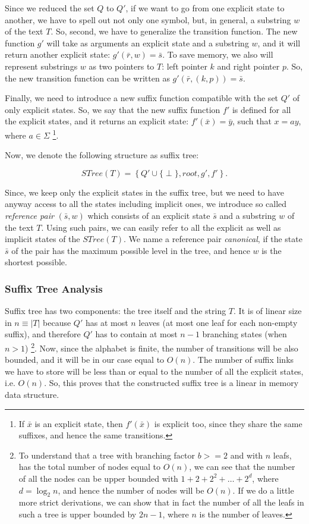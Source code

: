 \documentclass[paper=a4, fontsize=11pt]{scrartcl} %
\numberwithin{equation}{section} %
\numberwithin{figure}{section} %
\numberwithin{table}{section} %
\begin{document}
Since we reduced the set $Q$ to $Q'$, if we want to go from one explicit state to another, we have to spell out not only one symbol, but, in general, a substring $w$ of the text $T$. So, second, we have to generalize the transition function. The new function $g'$ will take as arguments an explicit state and a substring $w$, and it will return another explicit state: $g'(\bar{r}, w) = \bar{s}$. To save memory, we also will represent substrings $w$ as two pointers to $T$: left pointer $k$ and right pointer $p$. So, the new transition function can be written as $g'(\bar{r},(k,p)) = \bar{s}$.

Finally, we need to introduce a new suffix function compatible with the set $Q'$ of only explicit states. So, we say that the new suffix function $f'$ is defined for all the explicit states, and it returns an explicit state: $f'(\bar{x}) = \bar{y}$, such that $x = ay$, where $a \in \Sigma$ \footnote{If $\bar{x}$ is an explicit state, then $f'(\bar{x})$ is explicit too, since they share the same suffixes, and hence the same transitions.}.

Now, we denote the following structure as suffix tree:

\begin{equation}
STree(T) = \left\{ Q' \cup \{\perp\}, root, g', f' \right\}.
\end{equation}

Since, we keep only the explicit states in the suffix tree, but we need to have anyway access to all the states including implicit ones, we introduce so called \textit{reference pair} $(\bar s, w)$ which consists of an explicit state $\bar s$ and a substring $w$ of the text $T$. Using such pairs, we can easily refer to all the explicit as well as implicit states of the $STree(T)$. We name a reference pair \textit{canonical}, if the state $\bar s$ of the pair has the maximum possible level in the tree, and hence $w$ is the shortest possible.

\subsubsection{Suffix Tree Analysis}
Suffix tree has two components: the tree itself and the string $T$. It is of linear size in $n \equiv |T|$ because $Q'$ has at most $n$ leaves (at most one leaf for each non-empty suffix), and therefore $Q'$ has to contain at most $n - 1$ branching states (when $n > 1$) \footnote{To understand that a tree with branching factor $b >= 2$ and with $n$ leafs, has the total number of nodes equal to $O(n)$, we can see that the number of all the nodes can be upper bounded with $1 + 2 + 2^2 + \dots + 2^d$, where $d = \log_2n$, and hence the number of nodes will be $O(n)$. If we do a little more strict derivations, we can show that in fact the number of all the leafs in such a tree is upper bounded by $2n - 1$, where $n$ is the number of leaves.}. Now, since the alphabet is finite, the number of transitions will be also bounded, and it will be in our case equal to $O(n)$. The number of suffix links we have to store will be less than or equal to the number of all the explicit states, i.e. $O(n)$. So, this proves that the constructed suffix tree is a linear in memory data structure.
\end{document}
